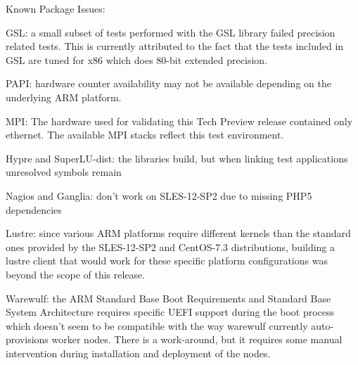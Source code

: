 \noindent Known Package Issues: 
\begin{itemize*}

\item GSL: a small subset of tests performed with the GSL library failed precision
related tests. This is currently attributed to the fact that the tests included
in GSL are tuned for x86 which does 80-bit extended precision.
\item PAPI: hardware counter availability may not be available depending on the
underlying ARM platform.
\item MPI: The hardware used for validating this Tech Preview release contained
only ethernet. The available MPI stacks reflect this test environment.
\item Hypre and SuperLU-dist: the libraries build, but when linking test
applications unresolved symbols remain
\item Nagios and Ganglia: don't work on SLES-12-SP2 due to missing PHP5
dependencies
\item Lustre: since various ARM platforms require different kernels than the
standard ones provided by the SLES-12-SP2 and CentOS-7.3 distributions, 
building a lustre client that would work for these specific platform 
configurations was beyond the scope of this release.
\item Warewulf: the ARM Standard Base Boot Requirements and Standard Base System
Architecture requires specific UEFI support during the boot process which
doesn't seem to be compatible with the way warewulf currently auto-provisions
worker nodes. There is a work-around, but it requires some manual intervention
during installation and deployment of the nodes.
\end{itemize*}

